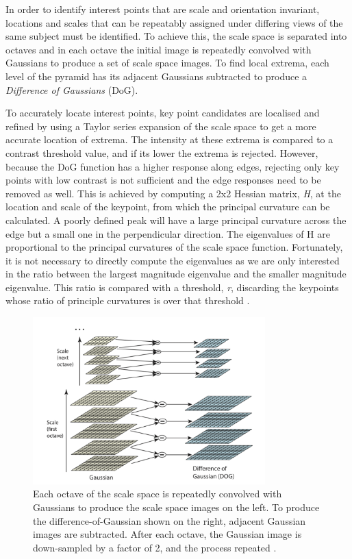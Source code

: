 \documentclass{l4proj}
\begin{document}
In order to identify interest points that are scale and orientation invariant, locations and scales that can be repeatably assigned under differing views of the same subject must be identified.  To achieve this, the scale space is separated into octaves and in each octave the initial image is repeatedly convolved with Gaussians to produce a set of scale space images. To find local extrema, each level of the pyramid has its adjacent Gaussians subtracted to produce a \textit{Difference of Gaussians} (DoG). 

To accurately locate interest points, key point candidates are localised and refined by using
a Taylor series expansion of the scale space to get a more accurate location of extrema. The
intensity at these extrema is compared to a contrast threshold value, and if its lower the
extrema is rejected. However, because the DoG function has a higher response along edges,
rejecting only key points with low contrast is not sufficient and the edge responses need to be removed as well. This is achieved by computing a 2x2 Hessian matrix, \textit{H}, at the location and scale of the keypoint, from which the principal curvature can be calculated. A poorly defined peak will have a large principal curvature across the edge but a small one in the
perpendicular direction. The eigenvalues of H are proportional to the principal curvatures of
the scale space function. Fortunately, it is not necessary to directly compute the eigenvalues
as we are only interested in the ratio between the largest magnitude eigenvalue and the
smaller magnitude eigenvalue. This ratio is compared with a threshold, \textit{r}, discarding the
keypoints whose ratio of principle curvatures is over that threshold \citep{Lowe04}.

\begin{figure}[ht]
    \centering
    \includegraphics[width=0.8\textwidth]{l4template-master/images/gaussianPyramid.png}
    \caption{Each octave of the scale space is repeatedly convolved with Gaussians to produce the scale space images on the left. To produce the difference-of-Gaussian shown on the right, adjacent Gaussian images are subtracted. After each octave, the Gaussian image is down-sampled by a factor of 2, and the process repeated \citep{Lowe04}.}
    \label{gaussianpyramid}
\end{figure}
\end{document}
